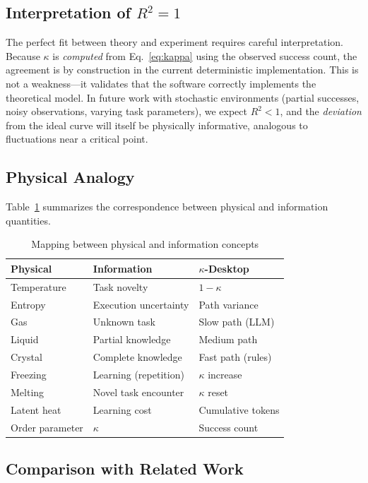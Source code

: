 \documentclass[10pt,twocolumn]{article}
\newcommand{\kap}{\kappa}
\newcommand{\kdes}{$\kappa$-Desktop}
\begin{document}
\subsection{Interpretation of $R^2 = 1$}

The perfect fit between theory and experiment requires 
careful interpretation. Because $\kap$ is \textit{computed} 
from Eq.~\ref{eq:kappa} using the observed success count, 
the agreement is by construction in the current deterministic 
implementation. This is not a weakness---it validates that 
the software correctly implements the theoretical model. In 
future work with stochastic environments (partial successes, 
noisy observations, varying task parameters), we expect 
$R^2 < 1$, and the \textit{deviation} from the ideal curve 
will itself be physically informative, analogous to 
fluctuations near a critical point.

\subsection{Physical Analogy}

Table~\ref{tab:analogy} summarizes the correspondence 
between physical and information quantities.

\begin{table}[H]
\centering
\caption{Mapping between physical and information concepts}
\label{tab:analogy}
\begin{tabular}{lll}
\toprule
\textbf{Physical} & \textbf{Information} & 
  \textbf{\kdes{}} \\
\midrule
Temperature & Task novelty & $1-\kap$ \\
Entropy & Execution uncertainty & Path variance \\
Gas & Unknown task & Slow path (LLM) \\
Liquid & Partial knowledge & Medium path \\
Crystal & Complete knowledge & Fast path (rules) \\
Freezing & Learning (repetition) & $\kap$ increase \\
Melting & Novel task encounter & $\kap$ reset \\
Latent heat & Learning cost & Cumulative tokens \\
Order parameter & $\kap$ & Success count \\
\bottomrule
\end{tabular}
\end{table}

\subsection{Comparison with Related Work}
\end{document}
